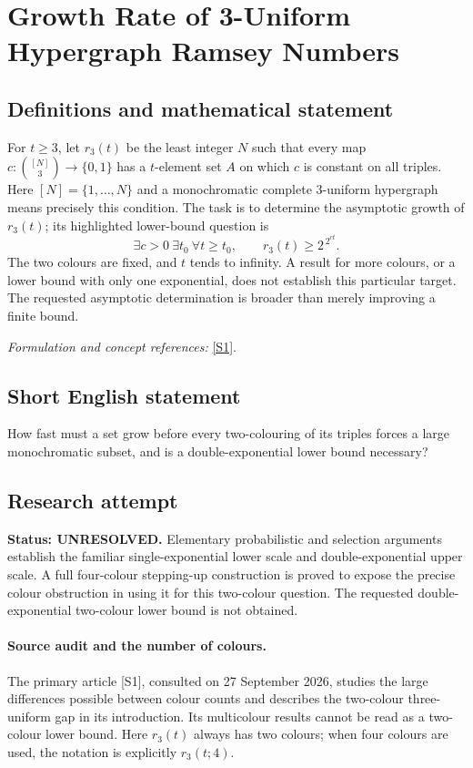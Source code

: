 \documentclass[11pt]{article}
\begin{document}
\section*{\texorpdfstring{Growth Rate of 3-Uniform Hypergraph Ramsey Numbers}{Growth Rate of 3-Uniform Hypergraph Ramsey Numbers}}\label{30006847}
\subsection{Definitions and mathematical statement}
For $t\ge3$, let $r_3(t)$ be the least integer $N$ such that every map $c:\binom{[N]}3\to\{0,1\}$ has a $t$-element set $A$ on which $c$ is constant on all triples. Here $[N]=\{1,\ldots,N\}$ and a monochromatic complete $3$-uniform hypergraph means precisely this condition. The task is to determine the asymptotic growth of $r_3(t)$; its highlighted lower-bound question is
\[
 \exists c>0\ \exists t_0\ \forall t\ge t_0,
 \qquad r_3(t)\ge 2^{\,2^{ct}}.
\]
The two colours are fixed, and $t$ tends to infinity. A result for more colours, or a lower bound with only one exponential, does not establish this particular target. The requested asymptotic determination is broader than merely improving a finite bound.
\par\smallskip\textit{Formulation and concept references:} \href{https://www.cambridge.org/core/journals/forum-of-mathematics-sigma/article/tower-gaps-in-multicolour-ramsey-numbers/B688491701E6FCC40E202C9B7B3AB672}{[S1]}.

\subsection{Short English statement}
How fast must a set grow before every two-colouring of its triples forces a large monochromatic subset, and is a double-exponential lower bound necessary?
\subsection{Research attempt}
\textbf{Status: UNRESOLVED.} Elementary probabilistic and selection arguments establish the familiar single-exponential lower scale and double-exponential upper scale. A full four-colour stepping-up construction is proved to expose the precise colour obstruction in using it for this two-colour question. The requested double-exponential two-colour lower bound is not obtained.

\paragraph{Source audit and the number of colours.}
The primary article [S1], consulted on 27 September 2026, studies the large differences possible between colour counts and describes the two-colour three-uniform gap in its introduction. Its multicolour results cannot be read as a two-colour lower bound. Here $r_3(t)$ always has two colours; when four colours are used, the notation is explicitly $r_3(t;4)$.
\end{document}
